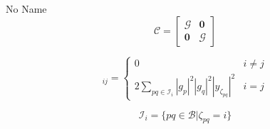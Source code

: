 \documentclass[a4paper,10pt]{article}
\begin{document}
\begin{section}{No Name}
\begin{equation}
\boldsymbol{\mathcal{C}} =
\begin{bmatrix}
\boldsymbol{\mathcal{G}} & \boldsymbol{0}\\
\boldsymbol{0} & \boldsymbol{\mathcal{G}}
\end{bmatrix}
\end{equation}

\begin{equation}
 [\boldsymbol{\mathcal{G}}]_{ij} = 
\begin{cases}
0 & i\neq j\\
2\sum_{pq\in\mathcal{I}_{i}} |g_p|^2|g_q|^2|y_{\zeta_{pq}}|^2 & i=j
\end{cases}
\end{equation}

\begin{equation}
\mathcal{I}_i = \{pq\in\mathcal{B}|\zeta_{pq}=i\} 
\end{equation}

\end{section}
\end{document}
